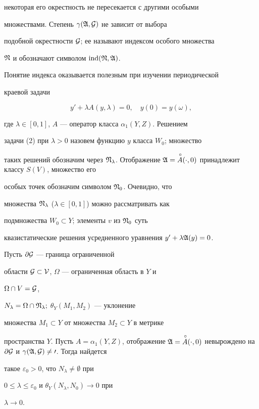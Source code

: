 некоторая его окрестность не пересекается с другими особыми 


множествами. Степень $\gamma(\frak A,\cal G)$ не зависит от выбора 


подобной окрестности $\cal G$; ее называют индексом особого множества 


$\frak N$ и обозначают символом $\operatorname{ind}(\frak N,\frak A)$. 


 


Понятие индекса оказывается полезным при изучении периодической 


краевой задачи 


\begin{equation} 


y'+\lambda A(y,\lambda)=0,\quad y(0)=y(\omega), 


\end{equation} 


где $\lambda\in[0,1]$, $A$ --- оператор класса $\alpha_1(Y,Z)$. Решением 


задачи (2) при $\lambda>0$ назовем функцию $y$ класса $W_0$; множество 


таких решений обозначим через $\frak N_\lambda$. Отображение $\frak 


A=\up{A}(\cdot,0)$ принадлежит классу $S(V)$, множество его 


особых точек обозначим символом $\frak N_0$. Очевидно, что 


множества $\frak N_\lambda$ ($\lambda\in[0,1]$) можно рассматривать как 


подмножества $W_0\subset Y$; элементы $v$ из $\frak N_0$ суть 


квазистатические решения усредненного уравнения $y'+\lambda\frak A(y)=0$. 


 


\begin{prop} 


Пусть $\partial\cal G$ --- граница ограниченной 


области $\cal G\subset V$, $\Omega$ --- ограниченная область в $Y$ и 


$\Omega\cap V=\cal G$, 


$N_\lambda=\Omega\cap\frak N_\lambda;$ $\theta_Y(M_1,M_2)$ --- уклонение 


множества $M_1\subset Y$ от множества $M_2\subset Y$ в метрике 


пространства $Y$. Пусть $A=\alpha_1(Y,Z)$, отображение $\frak 


A=\up{A}(\cdot,0)$ невырождено на $\partial\cal G$ и $\gamma(\frak 


A,\cal G)\ne0$. Тогда найдется 


такое $\varepsilon_0>0$, что $N_\lambda\ne\emptyset$ при 


$0\le\lambda\le\varepsilon_0$ и $\theta_Y(N_\lambda,N_0)\to0$ при 


$\lambda\to0$. 


\end{prop} 


